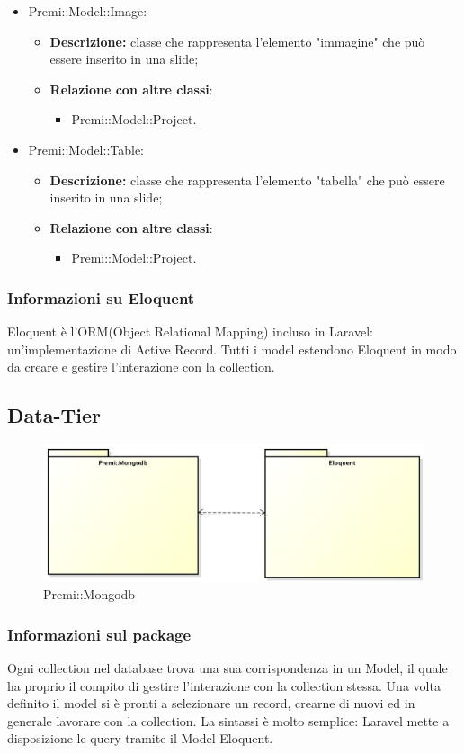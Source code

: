 \begin{itemize}
		\item Premi::Model::Image:
		\begin{itemize}
			\item \textbf{Descrizione:} classe che rappresenta l'elemento "immagine" che può essere inserito in una \gls{slide};
			\item \textbf{Relazione con altre classi}:
			\begin{itemize}
				\item Premi::Model::Project.
			\end{itemize}
		\end{itemize}
		
		\item Premi::Model::Table:
		\begin{itemize}
			\item \textbf{Descrizione:} classe che rappresenta l'elemento "tabella" che può essere inserito in una \gls{slide};
			\item \textbf{Relazione con altre classi}:
			\begin{itemize}
				\item Premi::Model::Project.
			\end{itemize}
		\end{itemize}
	\end{itemize}
	
\subsubsection*{Informazioni su Eloquent}
Eloquent è l'ORM(Object Relational Mapping) incluso in Laravel: un'implementazione di Active Record. Tutti i model estendono  Eloquent in modo da creare e gestire l'interazione con la collection.

\subsection{Data-Tier}
\begin{figure}[h]
\centering
\includegraphics[width=0.7\linewidth]{img/premi_mongodb}
\caption[Premi::Mongodb]{Premi::Mongodb}
\label{fig:premi_mongodb}
\end{figure}
\subsubsection*{Informazioni sul package}
Ogni collection nel database trova una sua corrispondenza in un Model, il quale ha proprio il compito di gestire l'interazione con la collection stessa. Una volta definito il model si è pronti a selezionare un record, crearne di nuovi ed in generale lavorare con la collection. La sintassi è molto semplice: Laravel mette a disposizione le query tramite il Model Eloquent.
